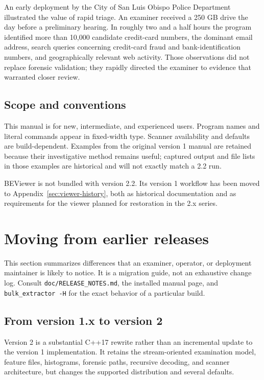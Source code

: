 \documentclass[11pt]{article}
\newcommand{\code}[1]{\texttt{#1}}
\begin{document}
An early deployment by the City of San Luis Obispo Police Department
illustrated the value of rapid triage. An examiner received a 250 GB drive the
day before a preliminary hearing. In roughly two and a half hours the program
identified more than 10,000 candidate credit-card numbers, the dominant email
address, search queries concerning credit-card fraud and bank-identification
numbers, and geographically relevant web activity. Those observations did not
replace forensic validation; they rapidly directed the examiner to evidence
that warranted closer review.

\subsection{Scope and conventions}

This manual is for new, intermediate, and experienced users. Program names and
literal commands appear in fixed-width type. Scanner availability and defaults
are build-dependent. Examples from the original version 1 manual are retained
because their investigative method remains useful; captured output and file
lists in those examples are historical and will not exactly match a 2.2 run.

BEViewer is not bundled with version 2.2. Its version 1 workflow has been moved
to Appendix~\ref{sec:viewer-history}, both as historical documentation and as
requirements for the viewer planned for restoration in the 2.x series.

\section{Moving from earlier releases}
\label{sec:moving-from-earlier-releases}

This section summarizes differences that an examiner, operator, or deployment
maintainer is likely to notice. It is a migration guide, not an exhaustive
change log. Consult \code{doc/RELEASE\_NOTES.md}, the installed manual page, and
\code{bulk\_extractor -H} for the exact behavior of a particular build.

\subsection{From version 1.x to version 2}

Version 2 is a substantial C++17 rewrite rather than an incremental update to
the version 1 implementation. It retains the stream-oriented examination
model, feature files, histograms, forensic paths, recursive decoding, and
scanner architecture, but changes the supported distribution and several
defaults.
\end{document}
